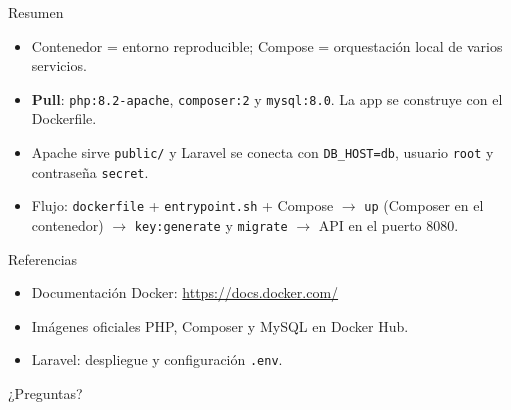 \documentclass[aspectratio=169,10pt]{beamer}
\begin{document}
\begin{frame}{Resumen}
  \begin{itemize}
    \item Contenedor = entorno reproducible; Compose = orquestación local de varios servicios.
    \item \textbf{Pull}: \texttt{php:8.2-apache}, \texttt{composer:2} y \texttt{mysql:8.0}. La app se construye con el Dockerfile.
    \item Apache sirve \texttt{public/} y Laravel se conecta con \texttt{DB\_HOST=db}, usuario \texttt{root} y contraseña \texttt{secret}.
    \item Flujo: \texttt{dockerfile} + \texttt{entrypoint.sh} + Compose $\rightarrow$ \texttt{up} (Composer en el contenedor) $\rightarrow$ \texttt{key:generate} y \texttt{migrate} $\rightarrow$ API en el puerto 8080.
  \end{itemize}
\end{frame}

\begin{frame}{Referencias}
  \small
  \begin{itemize}
    \item Documentación Docker: \url{https://docs.docker.com/}
    \item Imágenes oficiales PHP, Composer y MySQL en Docker Hub.
    \item Laravel: despliegue y configuración \texttt{.env}.
  \end{itemize}
  \vspace{1em}
  \centering
  ¿Preguntas?
\end{frame}
\end{document}
